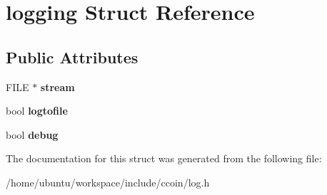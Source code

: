 \hypertarget{structlogging}{\section{logging Struct Reference}
\label{structlogging}
}
\subsection*{Public Attributes}
\begin{DoxyCompactItemize}
\item 
\hypertarget{structlogging_ac5910ff60fc85c3fe0586ee1e0fbaacf}{F\-I\-L\-E $\ast$ {\bfseries stream}}\label{structlogging_ac5910ff60fc85c3fe0586ee1e0fbaacf}

\item 
\hypertarget{structlogging_a8e95475cc91ec0b666e0fc2203f29031}{bool {\bfseries logtofile}}\label{structlogging_a8e95475cc91ec0b666e0fc2203f29031}

\item 
\hypertarget{structlogging_ac633ce153fc993365e6df971f6af73d5}{bool {\bfseries debug}}\label{structlogging_ac633ce153fc993365e6df971f6af73d5}

\end{DoxyCompactItemize}


The documentation for this struct was generated from the following file\-:\begin{DoxyCompactItemize}
\item 
/home/ubuntu/workspace/include/ccoin/log.\-h\end{DoxyCompactItemize}
